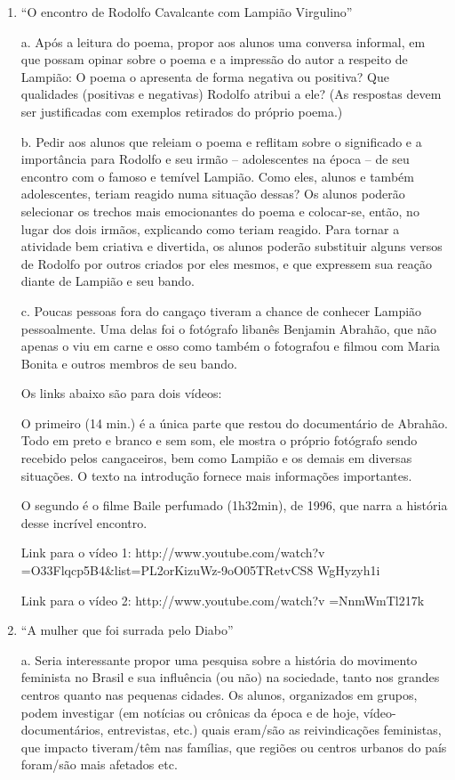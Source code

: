 \begin{enumerate}
\item “O encontro de Rodolfo Cavalcante com Lampião Virgulino”

a. Após a leitura do poema, propor aos alunos uma conversa informal,
em que possam opinar sobre o poema e a impressão do autor a respeito de
Lampião: O poema o apresenta de forma negativa ou positiva? Que
qualidades (positivas e negativas) Rodolfo atribui a ele? (As respostas
devem ser justificadas com exemplos retirados do próprio poema.)

b. Pedir aos alunos que releiam o poema e reflitam sobre o
significado e a importância para Rodolfo e seu irmão – adolescentes na
época – de seu encontro com o famoso e temível Lampião. Como eles,
alunos e também adolescentes, teriam reagido numa situação dessas? Os
alunos poderão selecionar os trechos mais emocionantes do poema e
colocar-se, então, no lugar dos dois irmãos, explicando como teriam
reagido. Para tornar a atividade bem criativa e divertida, os alunos
poderão substituir alguns versos de Rodolfo por outros criados por eles
mesmos, e que expressem sua reação diante de Lampião e seu bando.

c. Poucas pessoas fora do cangaço tiveram a chance de conhecer
Lampião pessoalmente. Uma delas foi o fotógrafo libanês Benjamin
Abrahão, que não apenas o viu em carne e osso como também o fotografou
e filmou com Maria Bonita e outros membros de seu bando. 

Os links abaixo são para dois vídeos: 

O primeiro (14 min.) é a única parte que restou do documentário de
Abrahão. Todo em preto e branco e sem som, ele mostra o próprio
fotógrafo sendo recebido pelos cangaceiros, bem como Lampião e os
demais em diversas situações. O texto na introdução fornece mais
informações importantes.

O segundo é o filme Baile perfumado (1h32min), de 1996, que narra a
história desse incrível encontro.

Link para o vídeo 1:
http://www.youtube.com/watch?v =O33Flqcp5B4\&list=PL2orKizuWz-9oO05TRetvCS8 WgHyzyh1i

Link para o vídeo 2: http://www.youtube.com/watch?v =NnmWmTl217k

\pagebreak

\item “A mulher que foi surrada pelo Diabo”

a. Seria interessante propor uma pesquisa sobre a história do
movimento feminista no Brasil e sua influência (ou não) na sociedade,
tanto nos grandes centros quanto nas pequenas cidades. Os alunos,
organizados em grupos, podem investigar (em notícias ou crônicas da
época e de hoje, vídeo-documentários, entrevistas, etc.) quais eram/são
as reivindicações feministas, que impacto tiveram/têm nas famílias, que
regiões ou centros urbanos do país foram/são mais afetados etc. 


\end{enumerate}
